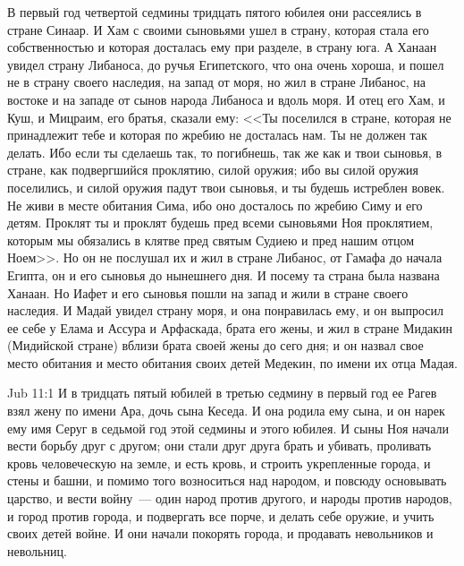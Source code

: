 В первый год четвертой седмины тридцать пятого
юбилея они рассеялись в стране Синаар. И Хам с
своими сыновьями ушел в страну, которая стала его
собственностью и которая досталась ему при
разделе, в страну юга. А Ханаан увидел страну
Либаноса, до ручья Египетского, что она очень
хороша, и пошел не в страну своего наследия, на
запад от моря, но жил в стране Либанос, на востоке
и на западе от сынов народа Либаноса и вдоль моря.
И отец его Хам, и Куш, и Мицраим, его братья,
сказали ему: <<Ты поселился в стране, которая не
принадлежит тебе и которая по жребию не
досталась нам. Ты не должен так делать. Ибо если
ты сделаешь так, то погибнешь, так же как и твои
сыновья, в стране, как подвергшийся проклятию,
силой оружия; ибо вы силой оружия поселились, и
силой оружия падут твои сыновья, и ты будешь
истреблен вовек. Не живи в месте обитания Сима,
ибо оно досталось по жребию Симу и его детям.
Проклят ты и проклят будешь пред всеми сыновьями
Ноя проклятием, которым мы обязались в клятве
пред святым Судиею и пред нашим отцом Ноем>>. Но
он не послушал их и жил в стране Либанос, от
Гамафа до начала Египта, он и его сыновья до
нынешнего дня. И посему та страна была названа
Ханаан. Но Иафет и его сыновья пошли на запад и
жили в стране своего наследия. И Мадай увидел
страну моря, и она понравилась ему, и он выпросил
ее себе у Елама и Ассура и Арфаскада, брата его
жены, и жил в стране Мидакин (Мидийской стране)
вблизи брата своей жены до сего дня; и он назвал
свое место обитания и место обитания своих детей Медекин, по имени их отца
Мадая.

\vs Jub 11:1
И в тридцать пятый юбилей в третью седмину в
первый год ее Рагев взял жену по имени Ара, дочь
сына Кеседа. И она родила ему сына, и он нарек ему
имя Серуг в седьмой год этой седмины и этого
юбилея. И сыны Ноя начали вести борьбу друг с
другом; они стали друг друга брать и убивать,
проливать кровь человеческую на земле, и есть
кровь, и строить укрепленные города, и стены и
башни, и помимо того возноситься над народом, и
повсюду основывать царство, и вести войну~--- один
народ против другого, и народы против народов, и
город против города, и подвергать все порче, и
делать себе оружие, и учить своих детей войне. И
они начали покорять города, и продавать
невольников и невольниц.

